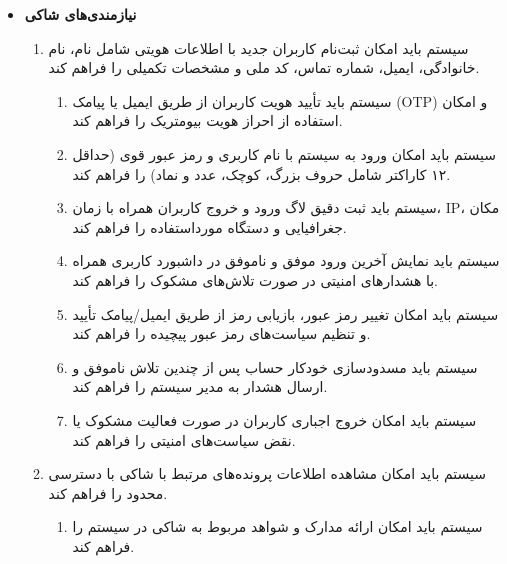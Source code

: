 \documentclass[12pt,a4paper,oneside]{article}
\begin{document}
    \begin{itemize}
        \item
        \textbf{نیازمندی‌های شاکی}
        \begin{enumerate}
            \renewcommand{\labelenumi}{\rl{{\arabic{enumi}}}R-}
    
            \item 
            سیستم باید امکان ثبت‌نام کاربران جدید با اطلاعات هویتی شامل نام، نام خانوادگی، ایمیل، شماره تماس، کد ملی و مشخصات تکمیلی را فراهم کند.
            \begin{enumerate}
                \renewcommand{\labelenumii}{{\rl{\arabic{enumii}.\arabic{enumi}}}R-}
                \item 
                سیستم باید تأیید هویت کاربران از طریق ایمیل یا پیامک (OTP) و امکان استفاده از احراز هویت بیومتریک را فراهم کند.
                \item 
                سیستم باید امکان ورود به سیستم با نام کاربری و رمز عبور قوی (حداقل ۱۲ کاراکتر شامل حروف بزرگ، کوچک، عدد و نماد) را فراهم کند.
                \item 
                سیستم باید ثبت دقیق لاگ ورود و خروج کاربران همراه با زمان، IP، مکان جغرافیایی و دستگاه مورداستفاده را فراهم کند.
                \item 
                سیستم باید نمایش آخرین ورود موفق و ناموفق در داشبورد کاربری همراه با هشدارهای امنیتی در صورت تلاش‌های مشکوک را فراهم کند.
                \item 
                سیستم باید امکان تغییر رمز عبور، بازیابی رمز از طریق ایمیل/پیامک تأیید و تنظیم سیاست‌های رمز عبور پیچیده را فراهم کند.
                \item 
                سیستم باید مسدودسازی خودکار حساب پس از چندین تلاش ناموفق و ارسال هشدار به مدیر سیستم را فراهم کند.
                \item 
                سیستم باید امکان خروج اجباری کاربران در صورت فعالیت مشکوک یا نقض سیاست‌های امنیتی را فراهم کند.
            \end{enumerate}
    
            \item 
            سیستم باید امکان مشاهده اطلاعات پرونده‌های مرتبط با شاکی با دسترسی محدود را فراهم کند.
            \begin{enumerate}
                \renewcommand{\labelenumii}{{\rl{\arabic{enumii}.\arabic{enumi}}}R-}
                \item 
                سیستم باید امکان ارائه مدارک و شواهد مربوط به شاکی در سیستم را فراهم کند.
            \end{enumerate}
        \end{enumerate}
    

\end{itemize}
\end{document}
